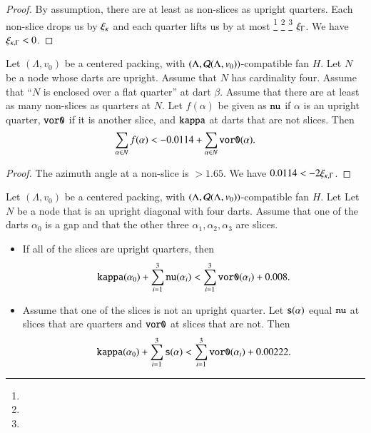 \begin{proof}
By assumption, there are at least as non-slices as upright quarters. Each
non-slice drops us by $\xi_\kappa$ and each quarter lifts us by at most%
\footnote{} %
\footnote{} %
\footnote{} %
$\xi_\Gamma$. We have $\xi_{\kappa,\Gamma}<0$.
\end{proof}

\begin{lemma}
Let $(\Lambda,v_0)$ be a centered packing, 
with $(\Lambda,{\mathcal Q}(\Lambda,v_0))$-compatible fan $H$.
Let $N$ be a node
whose darts are upright.  Assume that $N$ has cardinality four.
Assume that ``$N$ is enclosed over a flat quarter'' at dart $\beta$.
Assume that there are at least as many non-slices as quarters at $N$.
Let $f(\alpha)$ be given as ${\operatorname{{\texttt{nu}}}}$ if $\alpha$ is an upright
quarter, ${\operatorname{{\texttt{vor0}}}}$ if it is another slice, and
${\operatorname{{\texttt{kappa}}}}$ at darts that are not slices.  Then
  $$
  \sum_{\alpha\in N} f(\alpha) < -0.0114 + 
  \sum_{\alpha\in N} {\operatorname{{\texttt{vor0}}}}(\alpha).
  $$
\end{lemma}

\begin{proof}
The azimuth angle at a non-slice is $>1.65$. 
We have
$0.0114< -2\xi_{\kappa,\Gamma}$.
\end{proof}




\begin{lemma}
    \label{lemma:0.008}
Let $(\Lambda,v_0)$ be a centered packing, 
with $(\Lambda,{\mathcal Q}(\Lambda,v_0))$-compatible fan $H$.
Let
Let $N$ be a node that is an upright diagonal with four darts.  
Assume that one of the darts $\alpha_0$ is a gap and that the other
three $\alpha_1,\alpha_2,\alpha_3$ are slices.  
\begin{itemize}
\item If all of the slices are upright quarters, then
  $$
  {\operatorname{{\texttt{kappa}}}}(\alpha_0) + \sum_{i=1}^3 {\operatorname{{\texttt{nu}}}}(\alpha_i) <
  \sum_{i=1}^3 {\operatorname{{\texttt{vor0}}}}(\alpha_i) + 0.008.
  $$
\item Assume that one of the slices is not an upright quarter.
Let 
${\operatorname{{\texttt{s}}}}(\alpha)$ equal ${\operatorname{{\texttt{nu}}}}$ at slices that
are quarters and ${\operatorname{{\texttt{vor0}}}}$ at slices that are not.
Then
  $$
  {\operatorname{{\texttt{kappa}}}}(\alpha_0) + \sum_{i=1}^3 {\operatorname{{\texttt{s}}}}(\alpha) <
  \sum_{i=1}^3 {\operatorname{{\texttt{vor0}}}}(\alpha_i) + 0.00222.
  $$
\end{itemize}
\end{lemma}


